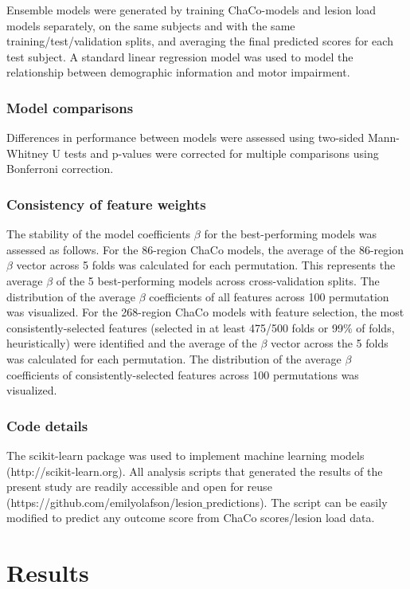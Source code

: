 \documentclass[10pt]{article}
\begin{document}
Ensemble models were generated by training ChaCo-models and lesion load models separately, on the same subjects and with the same training/test/validation splits, and averaging the final predicted scores for each test subject. A standard linear regression model was used to model the relationship between demographic information and motor impairment. 

\subsubsection*{Model comparisons}
Differences in performance between models were assessed using two-sided Mann-Whitney U tests and p-values were corrected for multiple comparisons using Bonferroni correction. 

\subsubsection*{Consistency of feature weights}
The stability of the model coefficients $\beta$ for the best-performing models was assessed as follows. For the 86-region ChaCo models, the average of the 86-region $\beta$ vector across 5 folds was calculated for each permutation. This represents the average $\beta$ of the 5 best-performing models across cross-validation splits. The distribution of the average $\beta$ coefficients of all features across 100 permutation was visualized. For the 268-region ChaCo models with feature selection, the most consistently-selected features (selected in at least 475/500 folds or 99$\%$ of folds, heuristically) were identified and the average of the $\beta$ vector across the 5 folds was calculated for each permutation. The distribution of the average $\beta$ coefficients of consistently-selected features across 100 permutations was visualized. 

\subsubsection*{Code details}
The scikit-learn package was used to implement machine learning models (http://scikit-learn.org). All analysis scripts that generated the results of the present study are readily accessible and open for reuse (https://github.com/emilyolafson/lesion$\_$predictions). The script can be easily modified to predict any outcome score from ChaCo scores/lesion load data.

\section{Results}
\end{document}
